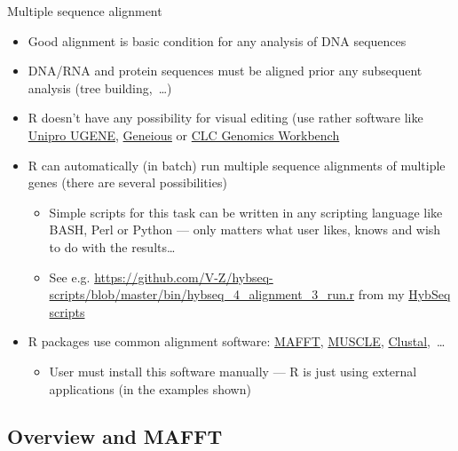 \documentclass[compress, xelatex, 11pt, xcolor=svgnames, aspectratio=169,
	hyperref={
		bookmarks=true,
		unicode=true,
		colorlinks=true,
		pdftitle={Molecular data in R},
		plainpages=false,
		pdfauthor={Vojtech Zeisek},
		pdfsubject={Course about phylogeny and evolution in R},
		pdfcreator={XeLaTeX},
		pdfkeywords={R, evolution, phylogeny, molecular data},
		linkcolor=Crimson, %
		anchorcolor=Magenta, %
		citecolor=Magenta, %
		filecolor=Magenta, %
		menucolor=Magenta, %
		urlcolor=DodgerBlue, %
		},
	url={hyphens, lowtilde} %
	]{beamer}
\begin{document}
\begin{frame}{Multiple sequence alignment}
	\label{alignment}
	\begin{itemize}
		\item Good alignment is basic condition for any analysis of DNA sequences
		\item DNA/RNA and protein sequences must be aligned prior any subsequent analysis (tree building,~\ldots)
		\item R doesn't have any possibility for visual editing (use rather software like \href{https://ugene.net/}{Unipro UGENE}, \href{https://www.geneious.com/}{Geneious} or \href{https://digitalinsights.qiagen.com/products-overview/analysis-and-visualization/qiagen-clc-genomics-workbench/}{CLC Genomics Workbench}
		\item R can automatically (in batch) run multiple sequence alignments of multiple genes (there are several possibilities)
		\begin{itemize}
			\item Simple scripts for this task can be written in any scripting language like BASH, Perl or Python --- only matters what user likes, knows and wish to do with the results\ldots
			\item See e.g. \url{https://github.com/V-Z/hybseq-scripts/blob/master/bin/hybseq_4_alignment_3_run.r} from my \href{https://github.com/V-Z/hybseq-scripts}{HybSeq scripts}
		\end{itemize}
		\item R packages use common alignment software: \href{https://mafft.cbrc.jp/alignment/software/}{MAFFT}, \href{https://www.drive5.com/muscle/}{MUSCLE}, \href{http://clustal.org/}{Clustal},~\ldots
		\begin{itemize}
			\item User must install this software manually --- R is just using external applications (in the examples shown)
		\end{itemize}
	\end{itemize}
\end{frame}

\subsection{Overview and MAFFT}
\end{document}
